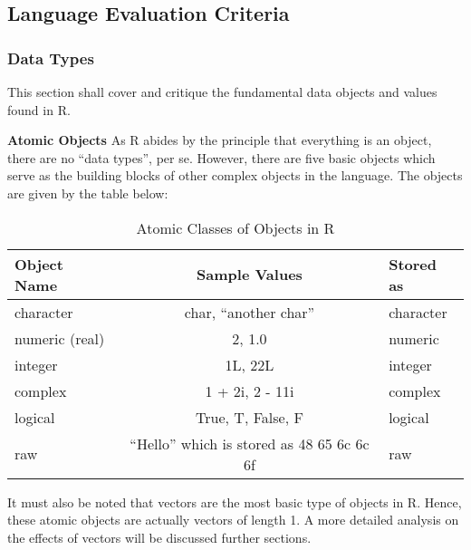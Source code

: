 \documentclass[12pt]{article}
\begin{document}
\subsection{Language Evaluation Criteria}

\subsubsection{Data Types}
This section shall cover and critique the fundamental data objects and values found in R.

\textbf{Atomic Objects} As R abides by the principle that everything is an object, there are no ``data types'', per se. However, there are five basic objects which serve as the building blocks of other complex objects in the language. The objects are given by the table below:

\begin{table}[h!]
  \begin{center}
    \caption{Atomic Classes of Objects in R}
    \label{tab:table1}
    \begin{tabular}{|l|c|l|}
      \toprule %
      \textbf{Object Name} & \textbf{Sample Values} & \textbf{Stored as}\\
      \midrule %
      character & char, ``another char'' & character \\
      \hline
      numeric (real) & 2, 1.0 & numeric \\
      \hline
      integer & 1L, 22L & integer \\
      \hline
      complex & 1 + 2i, 2 - 11i & complex \\
      \hline
      logical & True, T, False, F & logical \\
      \hline
      raw & ``Hello'' which is stored as 48 65 6c 6c 6f& raw \\
      \bottomrule
    \end{tabular}
  \end{center}
\end{table}

It must also be noted that vectors are the most basic type of objects in R. Hence, these atomic objects are actually vectors of length 1. A more detailed analysis on the effects of vectors will be discussed further sections.
\end{document}
